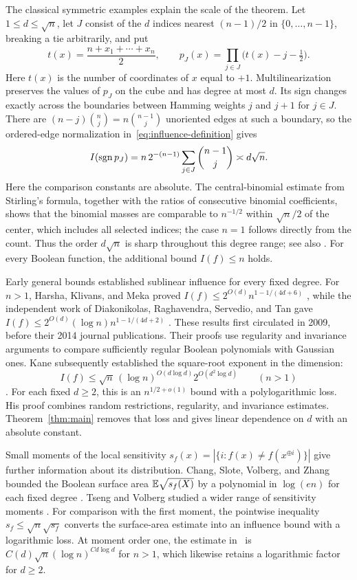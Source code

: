 The classical symmetric examples explain the scale of the theorem.
Let $1\le d\le\sqrt n$, let $J$ consist of the $d$ indices nearest
$(n-1)/2$ in $\{0,\ldots,n-1\}$, breaking a tie arbitrarily, and put
\[
 t(x)=\frac{n+x_1+\cdots+x_n}{2},\qquad
 p_J(x)=\prod_{j\in J}\bigl(t(x)-j-\tfrac12\bigr).
\]
Here $t(x)$ is the number of coordinates of $x$ equal to $+1$.
Multilinearization preserves the values of $p_J$ on the cube and has
degree at most $d$. Its sign changes exactly across the boundaries
between Hamming weights $j$ and $j+1$ for $j\in J$. There are
$(n-j)\binom nj=n\binom{n-1}j$ unoriented edges at such a boundary,
so the ordered-edge normalization in~\eqref{eq:influence-definition}
gives
\[
 I(\operatorname{sgn} p_J)=n\,2^{-(n-1)}\sum_{j\in J}\binom{n-1}j
 \asymp d\sqrt n.
\]
Here the comparison constants are absolute. The central-binomial
estimate from Stirling's formula, together with the ratios of consecutive
binomial coefficients, shows that the binomial masses are comparable
to $n^{-1/2}$ within $\sqrt n/2$ of the center, which includes all
selected indices; the case $n=1$ follows directly from the count.
Thus the order $d\sqrt n$ is sharp throughout
this degree range; see also
\cite[p.~3, discussion following Theorem~1.1]{KimMaldonadoWellens2017}.
For every Boolean function, the additional bound $I(f)\le n$ holds.

Early general bounds established sublinear influence for every fixed
degree. For $n>1$, Harsha, Klivans, and Meka proved
$I(f)\le2^{O(d)}n^{1-1/(4d+6)}$
\cite[Theorem~1.6]{HarshaKlivansMeka2014}, while the independent work of
Diakonikolas, Raghavendra, Servedio, and Tan gave
$I(f)\le2^{O(d)}(\log n)n^{1-1/(4d+2)}$
\cite[Theorem~1.1]{DRST2014}.
These results first circulated in 2009, before their 2014 journal
publications. Their proofs use regularity and invariance arguments to
compare sufficiently regular Boolean polynomials with Gaussian ones.
Kane subsequently established the square-root exponent in the dimension:
\begin{equation}\label{eq:kane-bound}
 I(f)\le\sqrt n\,(\log n)^{O(d\log d)}2^{O(d^2\log d)}
 \qquad(n>1)
\end{equation}
\cite[Theorem~2]{Kane2014}.
For each fixed $d\ge2$, this is an $n^{1/2+o(1)}$ bound with a
polylogarithmic loss. His proof combines random restrictions, regularity,
and invariance estimates. Theorem~\ref{thm:main} removes that loss and
gives linear dependence on $d$ with an absolute constant.

Small moments of the local sensitivity
$s_f(x)=|\{i:f(x)\ne f(x^{\oplus i})\}|$ give further information
about its distribution. Chang, Slote, Volberg, and Zhang bounded the
Boolean surface area $\mathbb E\sqrt{s_f(X)}$ by a polynomial in $\log(en)$
for each fixed degree
\cite[Theorem~1.1, equation~(1.6)]{ChangSloteVolbergZhang2026}.
Tseng and Volberg studied a wider range of sensitivity moments
\cite{TsengVolberg2026}.
For comparison with the first moment, the pointwise inequality
$s_f\le\sqrt n\sqrt{s_f}$ converts the surface-area estimate into an
influence bound with a logarithmic loss. At moment order one, the
estimate in~\cite[Section~2.5, equation~(11)]{TsengVolberg2026}
is $C(d)\sqrt n(\log n)^{Cd\log d}$ for $n>1$, which likewise retains a
logarithmic factor for $d\ge2$.

